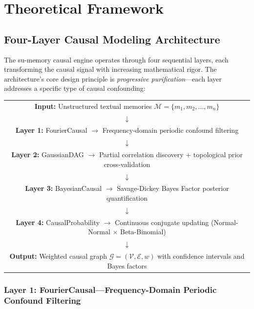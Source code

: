\documentclass[11pt,a4paper]{article}
\begin{document}
\section{Theoretical Framework}
\label{sec:theory}

\subsection{Four-Layer Causal Modeling Architecture}

The su-memory causal engine operates through four sequential layers, each transforming the causal signal with increasing mathematical rigor. The architecture's core design principle is \textit{progressive purification}---each layer addresses a specific type of causal confounding:

\begin{center}
\begin{tabular}{c}
\textbf{Input:} Unstructured textual memories \(\mathcal{M} = \{m_1, m_2, \ldots, m_n\}\) \\
\(\downarrow\) \\
\textbf{Layer 1:} FourierCausal \quad \(\to\) \quad Frequency-domain periodic confound filtering \\
\(\downarrow\) \\
\textbf{Layer 2:} GaussianDAG \quad \(\to\) \quad Partial correlation discovery + topological prior cross-validation \\
\(\downarrow\) \\
\textbf{Layer 3:} BayesianCausal \quad \(\to\) \quad Savage-Dickey Bayes Factor posterior quantification \\
\(\downarrow\) \\
\textbf{Layer 4:} CausalProbability \quad \(\to\) \quad Continuous conjugate updating (Normal-Normal \(\times\) Beta-Binomial) \\
\(\downarrow\) \\
\textbf{Output:} Weighted causal graph \(\mathcal{G} = (\mathcal{V}, \mathcal{E}, w)\) with confidence intervals and Bayes factors
\end{tabular}
\end{center}

\subsubsection{Layer 1: FourierCausal---Frequency-Domain Periodic Confound Filtering}
\end{document}
